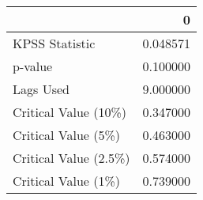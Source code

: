\begin{tabular}{lr}
\toprule
{} &         0 \\
\midrule
KPSS Statistic        &  0.048571 \\
p-value               &  0.100000 \\
Lags Used             &  9.000000 \\
Critical Value (10\%)  &  0.347000 \\
Critical Value (5\%)   &  0.463000 \\
Critical Value (2.5\%) &  0.574000 \\
Critical Value (1\%)   &  0.739000 \\
\bottomrule
\end{tabular}
